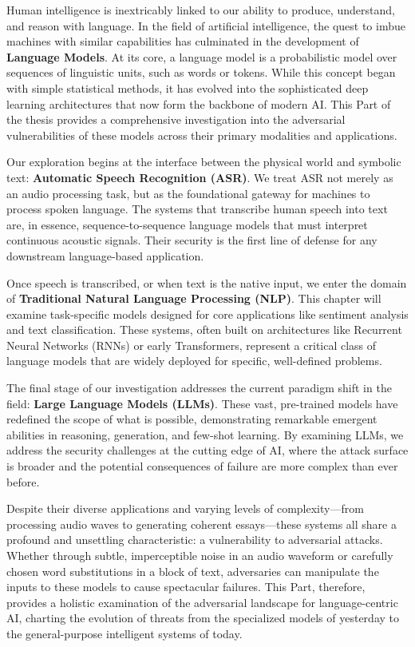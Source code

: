 \documentclass[../main.tex]{subfiles}
\begin{document}
Human intelligence is inextricably linked to our ability to produce, understand, and reason with language. In the field of artificial intelligence, the quest to imbue machines with similar capabilities has culminated in the development of \textbf{Language Models}. At its core, a language model is a probabilistic model over sequences of linguistic units, such as words or tokens. While this concept began with simple statistical methods, it has evolved into the sophisticated deep learning architectures that now form the backbone of modern AI. This Part of the thesis provides a comprehensive investigation into the adversarial vulnerabilities of these models across their primary modalities and applications.

Our exploration begins at the interface between the physical world and symbolic text: \textbf{Automatic Speech Recognition (ASR)}. We treat ASR not merely as an audio processing task, but as the foundational gateway for machines to process spoken language. The systems that transcribe human speech into text are, in essence, sequence-to-sequence language models that must interpret continuous acoustic signals. Their security is the first line of defense for any downstream language-based application.

Once speech is transcribed, or when text is the native input, we enter the domain of \textbf{Traditional Natural Language Processing (NLP)}. This chapter will examine task-specific models designed for core applications like sentiment analysis and text classification. These systems, often built on architectures like Recurrent Neural Networks (RNNs) or early Transformers, represent a critical class of language models that are widely deployed for specific, well-defined problems.

The final stage of our investigation addresses the current paradigm shift in the field: \textbf{Large Language Models (LLMs)}. These vast, pre-trained models have redefined the scope of what is possible, demonstrating remarkable emergent abilities in reasoning, generation, and few-shot learning. By examining LLMs, we address the security challenges at the cutting edge of AI, where the attack surface is broader and the potential consequences of failure are more complex than ever before.

Despite their diverse applications and varying levels of complexity—from processing audio waves to generating coherent essays—these systems all share a profound and unsettling characteristic: a vulnerability to adversarial attacks. Whether through subtle, imperceptible noise in an audio waveform or carefully chosen word substitutions in a block of text, adversaries can manipulate the inputs to these models to cause spectacular failures. This Part, therefore, provides a holistic examination of the adversarial landscape for language-centric AI, charting the evolution of threats from the specialized models of yesterday to the general-purpose intelligent systems of today.
\end{document}
